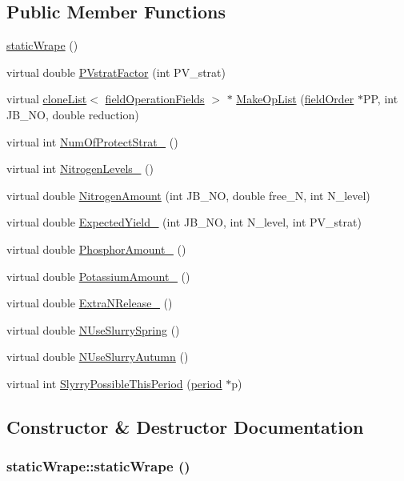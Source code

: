 \subsection*{Public Member Functions}
\begin{DoxyCompactItemize}
\item 
\hyperlink{classstatic_wrape_a759c7660a732be060ecd5a925f6bfb7f}{staticWrape} ()
\item 
virtual double \hyperlink{classstatic_wrape_a33e17fbd72287a058011486c611abdf8}{PVstratFactor} (int PV\_\-strat)
\item 
virtual \hyperlink{classclone_list}{cloneList}$<$ \hyperlink{classfield_operation_fields}{fieldOperationFields} $>$ $\ast$ \hyperlink{classstatic_wrape_a5d54894462f4539795ccfaaf89296327}{MakeOpList} (\hyperlink{classfield_order}{fieldOrder} $\ast$PP, int JB\_\-NO, double reduction)
\item 
virtual int \hyperlink{classstatic_wrape_afc484a4521f9840417ed6e2b5033b022}{NumOfProtectStrat\_\-} ()
\item 
virtual int \hyperlink{classstatic_wrape_a69e388d2e7b1fdafb864ea94277c546a}{NitrogenLevels\_\-} ()
\item 
virtual double \hyperlink{classstatic_wrape_a91d0074f8628913cbc19368d40ba3d38}{NitrogenAmount} (int JB\_\-NO, double free\_\-N, int N\_\-level)
\item 
virtual double \hyperlink{classstatic_wrape_a50f665a89f57eaafd331b4b47f453b94}{ExpectedYield\_\-} (int JB\_\-NO, int N\_\-level, int PV\_\-strat)
\item 
virtual double \hyperlink{classstatic_wrape_acd42c532d438b9f9ed0a57bf83bdf2bc}{PhosphorAmount\_\-} ()
\item 
virtual double \hyperlink{classstatic_wrape_a403c34aa6870748b3357f3f69b183824}{PotassiumAmount\_\-} ()
\item 
virtual double \hyperlink{classstatic_wrape_a104ee6695eb00810ebffd99b45c4bdd0}{ExtraNRelease\_\-} ()
\item 
virtual double \hyperlink{classstatic_wrape_a12cfad03bdf4d12b10f6c2a35329e7f9}{NUseSlurrySpring} ()
\item 
virtual double \hyperlink{classstatic_wrape_a20762299252b95a5d750f27bbf56dc66}{NUseSlurryAutumn} ()
\item 
virtual int \hyperlink{classstatic_wrape_aa71a6c10b4067dacffa833af07a04d8f}{SlyrryPossibleThisPeriod} (\hyperlink{classperiod}{period} $\ast$p)
\end{DoxyCompactItemize}


\subsection{Constructor \& Destructor Documentation}
\hypertarget{classstatic_wrape_a759c7660a732be060ecd5a925f6bfb7f}{
\subsubsection[{staticWrape}]{\setlength{\rightskip}{0pt plus 5cm}staticWrape::staticWrape ()}}
\label{classstatic_wrape_a759c7660a732be060ecd5a925f6bfb7f}



